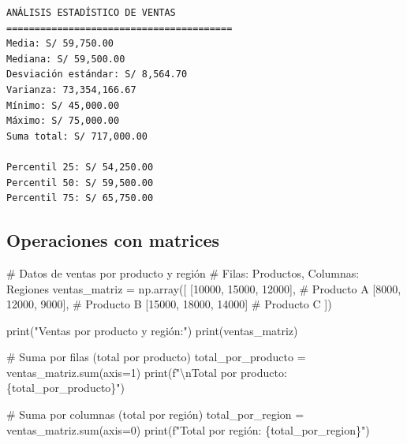 \documentclass[
  doc,
  floatsintext,
  longtable,
  a4paper,
  nolmodern,
  notxfonts,
  notimes,
  12pt,
  colorlinks=true,linkcolor=blue,citecolor=blue,urlcolor=blue]{apa7}
\newenvironment{Shaded}{\begin{snugshade}}{\end{snugshade}}
\newcommand{\BuiltInTok}[1]{\textcolor[rgb]{0.00,0.23,0.31}{#1}}
\newcommand{\CharTok}[1]{\textcolor[rgb]{0.13,0.47,0.30}{#1}}
\newcommand{\CommentTok}[1]{\textcolor[rgb]{0.37,0.37,0.37}{#1}}
\newcommand{\DecValTok}[1]{\textcolor[rgb]{0.68,0.00,0.00}{#1}}
\newcommand{\NormalTok}[1]{\textcolor[rgb]{0.00,0.23,0.31}{#1}}
\newcommand{\OperatorTok}[1]{\textcolor[rgb]{0.37,0.37,0.37}{#1}}
\newcommand{\SpecialCharTok}[1]{\textcolor[rgb]{0.37,0.37,0.37}{#1}}
\newcommand{\SpecialStringTok}[1]{\textcolor[rgb]{0.13,0.47,0.30}{#1}}
\newcommand{\StringTok}[1]{\textcolor[rgb]{0.13,0.47,0.30}{#1}}
\begin{document}
\begin{verbatim}
ANÁLISIS ESTADÍSTICO DE VENTAS
========================================
Media: S/ 59,750.00
Mediana: S/ 59,500.00
Desviación estándar: S/ 8,564.70
Varianza: 73,354,166.67
Mínimo: S/ 45,000.00
Máximo: S/ 75,000.00
Suma total: S/ 717,000.00

Percentil 25: S/ 54,250.00
Percentil 50: S/ 59,500.00
Percentil 75: S/ 65,750.00
\end{verbatim}

\subsection{Operaciones con matrices}\label{operaciones-con-matrices}

\begin{Shaded}
\begin{Highlighting}[]
\CommentTok{\# Datos de ventas por producto y región}
\CommentTok{\# Filas: Productos, Columnas: Regiones}
\NormalTok{ventas\_matriz }\OperatorTok{=}\NormalTok{ np.array([}
\NormalTok{    [}\DecValTok{10000}\NormalTok{, }\DecValTok{15000}\NormalTok{, }\DecValTok{12000}\NormalTok{],  }\CommentTok{\# Producto A}
\NormalTok{    [}\DecValTok{8000}\NormalTok{, }\DecValTok{12000}\NormalTok{, }\DecValTok{9000}\NormalTok{],    }\CommentTok{\# Producto B}
\NormalTok{    [}\DecValTok{15000}\NormalTok{, }\DecValTok{18000}\NormalTok{, }\DecValTok{14000}\NormalTok{]   }\CommentTok{\# Producto C}
\NormalTok{])}

\BuiltInTok{print}\NormalTok{(}\StringTok{"Ventas por producto y región:"}\NormalTok{)}
\BuiltInTok{print}\NormalTok{(ventas\_matriz)}

\CommentTok{\# Suma por filas (total por producto)}
\NormalTok{total\_por\_producto }\OperatorTok{=}\NormalTok{ ventas\_matriz.}\BuiltInTok{sum}\NormalTok{(axis}\OperatorTok{=}\DecValTok{1}\NormalTok{)}
\BuiltInTok{print}\NormalTok{(}\SpecialStringTok{f"}\CharTok{\textbackslash{}n}\SpecialStringTok{Total por producto: }\SpecialCharTok{\{}\NormalTok{total\_por\_producto}\SpecialCharTok{\}}\SpecialStringTok{"}\NormalTok{)}

\CommentTok{\# Suma por columnas (total por región)}
\NormalTok{total\_por\_region }\OperatorTok{=}\NormalTok{ ventas\_matriz.}\BuiltInTok{sum}\NormalTok{(axis}\OperatorTok{=}\DecValTok{0}\NormalTok{)}
\BuiltInTok{print}\NormalTok{(}\SpecialStringTok{f"Total por región: }\SpecialCharTok{\{}\NormalTok{total\_por\_region}\SpecialCharTok{\}}\SpecialStringTok{"}\NormalTok{)}


\end{Highlighting}
\end{Shaded}
\end{document}
